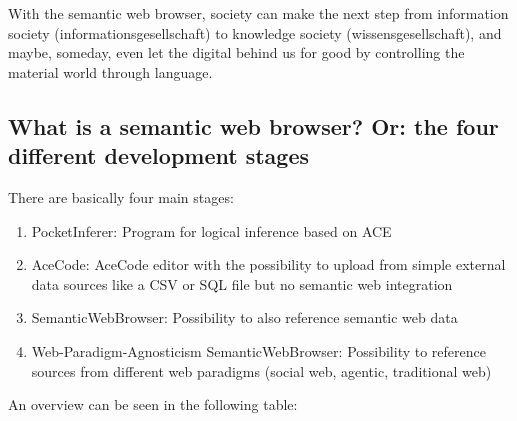 \documentclass[12pt,a4paper]{article}
\begin{document}
With the semantic web browser, society can make the next step from information society (informationsgesellschaft) to knowledge society (wissensgesellschaft), and maybe, someday, even let the digital behind us for good by controlling the material world through language.

\subsection{What is a semantic web browser? Or: the four different development stages}

There are basically four main stages:

\begin{enumerate}
    \item PocketInferer: Program for logical inference based on ACE
    \item AceCode: AceCode editor with the possibility to upload from simple external data sources like a CSV or SQL file but no semantic web integration
    \item SemanticWebBrowser: Possibility to also reference semantic web data
    \item Web-Paradigm-Agnosticism SemanticWebBrowser: Possibility to reference sources from different web paradigms (social web, agentic, traditional web)
\end{enumerate}

An overview can be seen in the following table:
\end{document}

